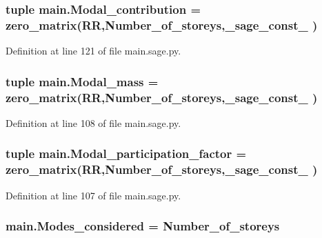 \subsubsection[{Modal\+\_\+contribution}]{\setlength{\rightskip}{0pt plus 5cm}tuple main.\+Modal\+\_\+contribution = zero\+\_\+matrix(R\+R,Number\+\_\+of\+\_\+storeys,\+\_\+sage\+\_\+const\+\_ )}\label{namespacemain_ab273c2ae46514d6ec3d905c30cbb5a1b}


Definition at line 121 of file main.\+sage.\+py.

\hypertarget{namespacemain_a176940b2d446033050ac092436f63974}{}
\subsubsection[{Modal\+\_\+mass}]{\setlength{\rightskip}{0pt plus 5cm}tuple main.\+Modal\+\_\+mass = zero\+\_\+matrix(R\+R,Number\+\_\+of\+\_\+storeys,\+\_\+sage\+\_\+const\+\_ )}\label{namespacemain_a176940b2d446033050ac092436f63974}


Definition at line 108 of file main.\+sage.\+py.

\hypertarget{namespacemain_a936ce857e8e4f4855af1cc5bf2635191}{}
\subsubsection[{Modal\+\_\+participation\+\_\+factor}]{\setlength{\rightskip}{0pt plus 5cm}tuple main.\+Modal\+\_\+participation\+\_\+factor = zero\+\_\+matrix(R\+R,Number\+\_\+of\+\_\+storeys,\+\_\+sage\+\_\+const\+\_ )}\label{namespacemain_a936ce857e8e4f4855af1cc5bf2635191}


Definition at line 107 of file main.\+sage.\+py.

\hypertarget{namespacemain_a9d22ac077c22a97b1b095068a1500d16}{}
\subsubsection[{Modes\+\_\+considered}]{\setlength{\rightskip}{0pt plus 5cm}main.\+Modes\+\_\+considered = Number\+\_\+of\+\_\+storeys}\label{namespacemain_a9d22ac077c22a97b1b095068a1500d16}



